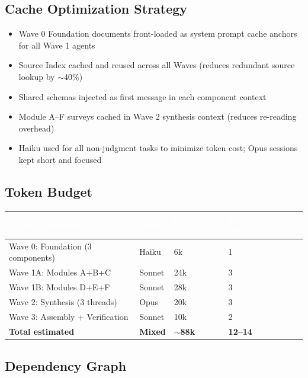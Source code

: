 \documentclass[11pt,letterpaper]{article}
\newcommand{\tableheader}[1]{\textbf{\sffamily\textcolor{white}{#1}}}
\begin{document}
\subsection{Cache Optimization Strategy}
\begin{itemize}
  \item Wave 0 Foundation documents front-loaded as system prompt cache anchors for all Wave 1 agents
  \item Source Index cached and reused across all Waves (reduces redundant source lookup by $\sim$40\%)
  \item Shared schemas injected as first message in each component context
  \item Module A--F surveys cached in Wave 2 synthesis context (reduces re-reading overhead)
  \item Haiku used for all non-judgment tasks to minimize token cost; Opus sessions kept short and focused
\end{itemize}

\subsection{Token Budget}

\begin{center}
\begin{tabularx}{\textwidth}{L{4cm}C{2cm}C{2cm}C{2.5cm}}
\toprule
{}
\tableheader{Wave / Component} & \tableheader{Model} & \tableheader{Est. Tokens} & \tableheader{Context Windows} \\
\midrule
Wave 0: Foundation (3 components) & Haiku & 6k & 1 \\
Wave 1A: Modules A+B+C & Sonnet & 24k & 3 \\
Wave 1B: Modules D+E+F & Sonnet & 28k & 3 \\
Wave 2: Synthesis (3 threads) & Opus & 20k & 3 \\
Wave 3: Assembly + Verification & Sonnet & 10k & 2 \\
\midrule
\textbf{Total estimated} & \textbf{Mixed} & \textbf{$\sim$88k} & \textbf{12--14} \\
\bottomrule
\end{tabularx}
\end{center}

\subsection{Dependency Graph}
\end{document}
